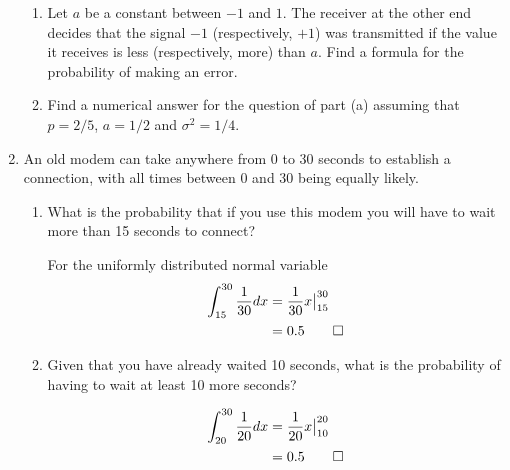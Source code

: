 \documentclass[paper=usletter, fontsize=12pt]{article}
\begin{document}
\begin{enumerate}
\begin{enumerate}
            \item Let $a$ be a constant between $-1$ and $1$.
            The receiver at the other end decides that the signal $-1$
            (respectively, $+1$) was transmitted if the value it receives is
            less (respectively, more) than $a$. Find a formula for the
            probability of making an error.
            \begin{cproof}
            \end{cproof}

            \item Find a numerical answer for the question of part (a) assuming
            that $p=2/5$, $a=1/2$ and $\sigma^2=1/4$.
            \begin{cproof}
            \end{cproof}

        \end{enumerate}

        \item An old modem can take anywhere from 0 to 30 seconds to establish
        a connection, with all times between 0 and 30 being equally likely.
        \begin{enumerate}

            \item What is the probability that if you use this modem you will
            have to wait more than 15 seconds to connect?
            \begin{cproof}

                For the uniformly distributed normal variable
                \begin{align*}
                    \int_{15}^{30} \frac{1}{30}dx & = \frac{1}{30}x\big\vert_{15}^{30}\\
                    & = 0.5 \qedhere
                \end{align*}
                \endgroup

            \end{cproof}

            \item Given that you have already waited 10 seconds, what is the
            probability of having to wait at least 10 more seconds?
            \begin{cproof}

                \begin{align*}
                    \int_{20}^{30} \frac{1}{20}dx & = \frac{1}{20}x\big\vert_{10}^{20}\\
                    & = 0.5 \qedhere
                \end{align*}
                \endgroup


\end{cproof}
\end{enumerate}
\end{enumerate}
\end{document}
